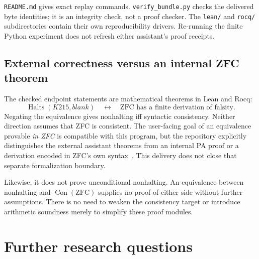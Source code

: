 \documentclass[11pt]{article}
\newcommand{\Con}{\operatorname{Con}}
\newcommand{\Halts}{\operatorname{Halts}}
\newcommand{\code}[1]{\texttt{\small #1}}
\begin{document}
\code{README.md} gives exact replay commands. \code{verify\_bundle.py} checks the delivered byte identities; it is an integrity check, not a proof checker. The \code{lean/} and \code{rocq/} subdirectories contain their own reproducibility drivers. Re-running the finite Python experiment does not refresh either assistant's proof receipts.

\subsection{External correctness versus an internal ZFC theorem}

The checked endpoint statements are mathematical theorems in Lean and Rocq:
\[
 \Halts(K215,\mathit{blank})\quad\longleftrightarrow\quad
 \text{ZFC has a finite derivation of falsity}.
\]
Negating the equivalence gives nonhalting iff syntactic consistency. Neither direction assumes that ZFC is consistent. The user-facing goal of an equivalence provable \emph{in ZFC} is compatible with this program, but the repository explicitly distinguishes the external assistant theorems from an internal PA proof or a derivation encoded in ZFC's own syntax~\cite{verification}. This delivery does not close that separate formalization boundary.

Likewise, it does not prove unconditional nonhalting. An equivalence between nonhalting and $\Con(\mathrm{ZFC})$ supplies no proof of either side without further assumptions. There is no need to weaken the consistency target or introduce arithmetic soundness merely to simplify these proof modules.

\section{Further research questions}
\end{document}
